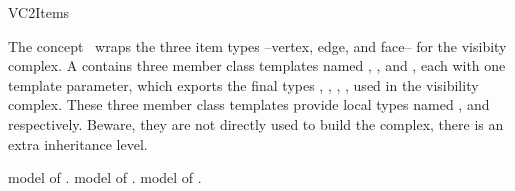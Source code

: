 
\ccRefPageBegin

\begin{ccRefConcept}{VC2Items}

\ccDefinition
  
The concept \ccRefName\ wraps the three item types --vertex, edge, and
face-- for the visibity complex.  A \ccRefName{} contains three member
class templates named , , and
, each with one template parameter, which exports the
final types , , , ,
 used in the visibility complex.  These three member class
templates provide local types named ,  and 
respectively. Beware, they are not directly used to build the complex,
there is an extra inheritance level.

\ccTypes
{}
    {model of .}
\ccGlue
{}
    {model of .}
\ccGlue
{}
    {model of .}

\ccHasModels
{}\\

\ccSeeAlso

\\
\\
\\
\end{ccRefConcept}
\ccRefPageEnd
